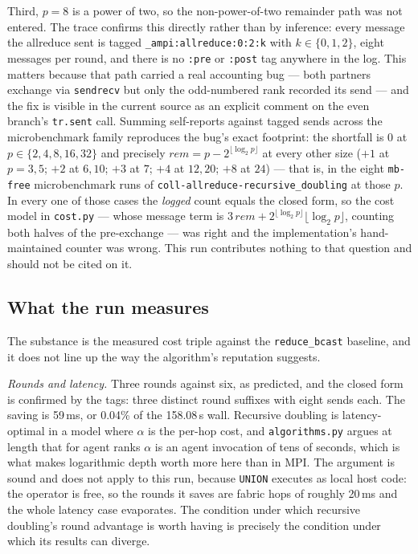 \documentclass[11pt]{article}
\begin{document}
Third, $p=8$ is a power of two, so the non-power-of-two remainder path was not entered. The trace
confirms this directly rather than by inference: every message the allreduce sent is tagged
\texttt{\_ampi:allreduce:0:2:k} with $k\in\{0,1,2\}$, eight messages per round, and there is no
\texttt{:pre} or \texttt{:post} tag anywhere in the log. This matters because that path carried a
real accounting bug --- both partners exchange via \texttt{sendrecv} but only the odd-numbered rank
recorded its send --- and the fix is visible in the current source as an explicit comment on the
even branch's \texttt{tr.sent} call. Summing self-reports against tagged sends across the
microbenchmark family reproduces the bug's exact footprint: the shortfall is $0$ at
$p\in\{2,4,8,16,32\}$ and precisely $\mathit{rem} = p - 2^{\lfloor \log_2 p\rfloor}$ at every other
size ($+1$ at $p=3,5$; $+2$ at $6,10$; $+3$ at $7$; $+4$ at $12,20$; $+8$ at $24$) --- that is, in
the eight \texttt{mb-free} microbenchmark runs of
\texttt{coll-allreduce-recursive\_doubling} at those $p$. In every one of
those cases the \emph{logged} count equals the closed form, so the cost model in
\texttt{cost.py} --- whose message term is $3\,\mathit{rem} + 2^{\lfloor \log_2 p\rfloor}\lfloor
\log_2 p\rfloor$, counting both halves of the pre-exchange --- was right and the implementation's
hand-maintained counter was wrong. This run contributes nothing to that question and should not be
cited on it.

\subsection*{What the run measures}

The substance is the measured cost triple against the \texttt{reduce\_bcast} baseline, and it does
not line up the way the algorithm's reputation suggests.

\emph{Rounds and latency.} Three rounds against six, as predicted, and the closed form is confirmed
by the tags: three distinct round suffixes with eight sends each. The saving is 59\,ms, or 0.04\%
of the 158.08\,s wall. Recursive doubling is latency-optimal in a model where $\alpha$ is the
per-hop cost, and \texttt{algorithms.py} argues at length that for agent ranks $\alpha$ is an agent
invocation of tens of seconds, which is what makes logarithmic depth worth more here than in MPI.
The argument is sound and does not apply to this run, because \texttt{UNION} executes as local host
code: the operator is free, so the rounds it saves are fabric hops of roughly 20\,ms and the whole
latency case evaporates. The condition under which recursive doubling's round advantage is worth
having is precisely the condition under which its results can diverge.
\end{document}

